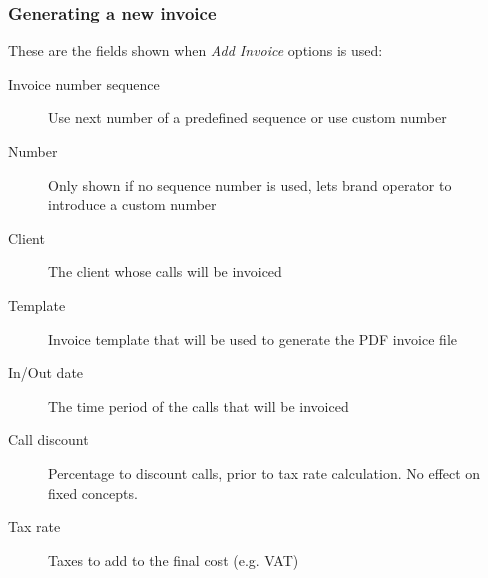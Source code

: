 \documentclass[letterpaper,10pt,spanish]{sphinxmanual}
\begin{document}
\subsubsection{Generating a new invoice}
\label{administration_portal/brand/invoicing/invoices:generating-a-new-invoice}
These are the fields shown when \emph{Add Invoice} options is used:
\begin{description}
\item[{Invoice number sequence}] \leavevmode{}\label{administration_portal/brand/invoicing/invoices:term-invoice-number-sequence}
Use next number of a predefined sequence or use custom number

\item[{Number}] \leavevmode{}\label{administration_portal/brand/invoicing/invoices:term-number}
Only shown if no sequence number is used, lets brand operator to introduce a custom number

\item[{Client}] \leavevmode{}\label{administration_portal/brand/invoicing/invoices:term-client}
The client whose calls will be invoiced

\item[{Template}] \leavevmode{}\label{administration_portal/brand/invoicing/invoices:term-template}
Invoice template that will be used to generate the PDF invoice file

\item[{In/Out date}] \leavevmode{}\label{administration_portal/brand/invoicing/invoices:term-in-out-date}
The time period of the calls that will be invoiced

\item[{Call discount}] \leavevmode{}\label{administration_portal/brand/invoicing/invoices:term-call-discount}
Percentage to discount calls, prior to tax rate calculation. No effect on fixed concepts.

\item[{Tax rate}] \leavevmode{}\label{administration_portal/brand/invoicing/invoices:term-tax-rate}
Taxes to add to the final cost (e.g. VAT)

\end{description}
\end{document}
